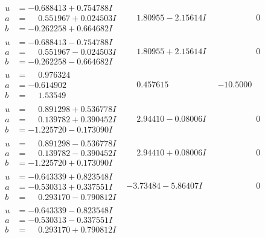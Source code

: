 \documentclass[1p]{elsarticle_modified}
\theoremstyle{definition}
\begin{document}
$$\begin{array}{c|c|c}
\begin{aligned}
u &= -0.688413 + 0.754788 I \\
a &= \phantom{-}0.551967 + 0.024503 I \\
b &= -0.262258 + 0.664682 I\end{aligned}
 & \phantom{-}1.80955 - 2.15614 I & \phantom{-0.000000 } 0 \\ \hline\begin{aligned}
u &= -0.688413 - 0.754788 I \\
a &= \phantom{-}0.551967 - 0.024503 I \\
b &= -0.262258 - 0.664682 I\end{aligned}
 & \phantom{-}1.80955 + 2.15614 I & \phantom{-0.000000 } 0 \\ \hline\begin{aligned}
u &= \phantom{-}0.976324\phantom{ +0.000000I} \\
a &= -0.614902\phantom{ +0.000000I} \\
b &= \phantom{-}1.53549\phantom{ +0.000000I}\end{aligned}
 & \phantom{-}0.457615\phantom{ +0.000000I} & -10.5000\phantom{ +0.000000I} \\ \hline\begin{aligned}
u &= \phantom{-}0.891298 + 0.536778 I \\
a &= \phantom{-}0.139782 + 0.390452 I \\
b &= -1.225720 - 0.173090 I\end{aligned}
 & \phantom{-}2.94410 - 0.08006 I & \phantom{-0.000000 } 0 \\ \hline\begin{aligned}
u &= \phantom{-}0.891298 - 0.536778 I \\
a &= \phantom{-}0.139782 - 0.390452 I \\
b &= -1.225720 + 0.173090 I\end{aligned}
 & \phantom{-}2.94410 + 0.08006 I & \phantom{-0.000000 } 0 \\ \hline\begin{aligned}
u &= -0.643339 + 0.823548 I \\
a &= -0.530313 + 0.337551 I \\
b &= \phantom{-}0.293170 - 0.790812 I\end{aligned}
 & -3.73484 - 5.86407 I & \phantom{-0.000000 } 0 \\ \hline\begin{aligned}
u &= -0.643339 - 0.823548 I \\
a &= -0.530313 - 0.337551 I \\
b &= \phantom{-}0.293170 + 0.790812 I\end{aligned}

\end{array}$$
\end{document}
